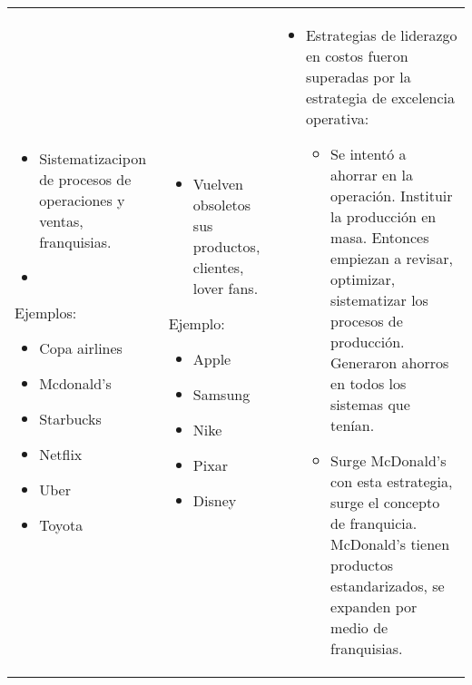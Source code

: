 \begin{itemize}
\begin{center}
\begin{supertabular}{ | p{6cm} | p{6cm} | p{6cm} |}
               \hline
                    \begin{itemize}
                        \item Sistematizacipon de procesos de operaciones y ventas, franquisias.
                        \item 
                    \end{itemize}
                    Ejemplos:
                        \begin{itemize}
                            \item Copa airlines 
                            \item Mcdonald's 
                            \item Starbucks 
                            \item Netflix 
                            \item Uber 
                            \item Toyota 
                        \end{itemize}
                    & 
                    \begin{itemize}
                        \item Vuelven obsoletos sus productos, clientes, lover fans.
                    \end{itemize}
                    Ejemplo:
                        \begin{itemize}
                            \item Apple 
                            \item Samsung 
                            \item Nike 
                            \item Pixar 
                            \item Disney 
                        \end{itemize}
                    & 
                    \begin{itemize}
                        \item Estrategias de liderazgo en costos fueron superadas por la estrategia de excelencia operativa:
                            \begin{itemize}
                                \item Se intentó a ahorrar en la operación. Instituir la producción en masa. Entonces empiezan a revisar, optimizar, sistematizar los procesos de producción. Generaron ahorros en todos los sistemas que tenían.
                                \item Surge McDonald's con esta estrategia, surge el concepto de franquicia. McDonald's tienen productos estandarizados, se expanden por medio de franquisias.

\end{itemize}
\end{itemize}
\end{supertabular}
\end{center}
\end{itemize}

